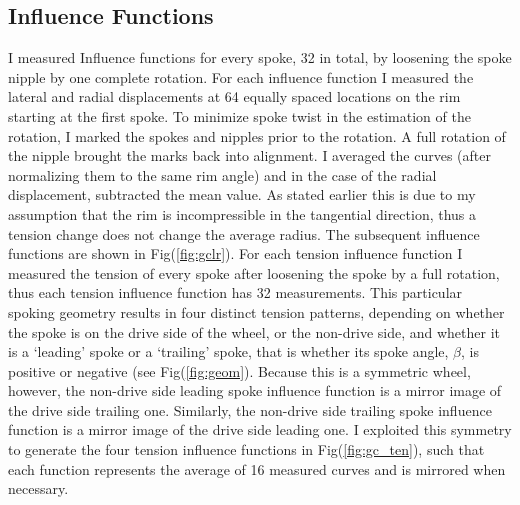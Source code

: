 \documentclass[journal]{IEEEtran}
\begin{document}
\subsection{Influence Functions}
I measured Influence functions for every spoke, 32 in total, by loosening the spoke nipple by one complete rotation. For each influence function I measured the lateral and radial displacements at 64 equally spaced locations on the rim starting at the first spoke. To minimize spoke twist in the estimation of the rotation, I marked the spokes and nipples prior to the rotation. A full rotation of the nipple brought the marks back into alignment. I averaged the curves (after normalizing them to the same rim angle) and in the case of the radial displacement, subtracted the mean value. As stated earlier this is due to my assumption that the rim is incompressible in the tangential direction, thus a tension change does not change the average radius.  The subsequent influence functions are shown in Fig(\ref{fig:gclr}).  For each tension influence function I measured the tension of every spoke after loosening the spoke by a full rotation, thus each tension influence function has 32 measurements. This particular spoking geometry results in four distinct tension patterns, depending on whether the spoke is on the drive side of the wheel, or the non-drive side, and whether it is a `leading' spoke or a `trailing' spoke, that is whether its spoke angle, $\beta$, is positive or negative (see Fig(\ref{fig:geom}).  Because this is a symmetric wheel, however, the non-drive side leading spoke influence function is a mirror image of the drive side trailing one.  Similarly, the non-drive side trailing spoke influence function is a mirror image of the drive side leading one. I exploited this symmetry to generate the four tension influence functions in Fig(\ref{fig:gc_ten}), such that each function represents the average of 16 measured curves and is mirrored when necessary.
\end{document}
